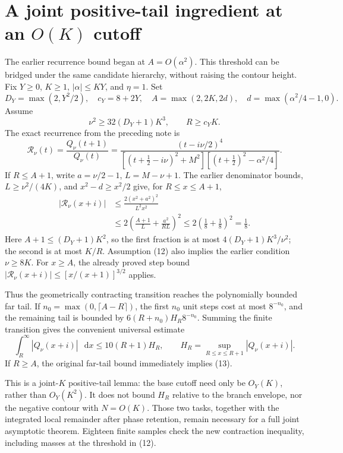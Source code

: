\documentclass[11pt,a4paper]{article}
\newcommand{\dd}{\mathop{}\!\mathrm d}
\begin{document}
\newpage
\section{A joint positive-tail ingredient at an \(O(K)\) cutoff}
The earlier recurrence bound began at \(A=O(\alpha^2)\). This
threshold can be bridged under the same candidate hierarchy,
without raising the contour height. Fix \(Y\ge0\), \(K\ge1\),
\(|\alpha|\le KY\), and \(\eta=1\). Set
\[
 D_Y=\max(2,Y^2/2),\quad c_Y=8+2Y,\quad
 A=\max(2,2K,2d),\quad d=\max(\alpha^2/4-1,0).
\]
Assume
\[
 \nu^2\ge32(D_Y+1)K^3,\qquad R\ge c_YK. \tag{12}
\]
The exact recurrence from the preceding note is
\[
 \mathcal R_\nu(t)=\frac{Q_\nu(t+1)}{Q_\nu(t)}
 =\frac{(t-i\nu/2)^4}
 {[(t+\tfrac12-i\nu)^2+M^2][(t+\tfrac12)^2-\alpha^2/4]}.
\]
If \(R\le A+1\), write \(a=\nu/2-1\), \(L=M-\nu+1\).
The earlier denominator bounds, \(L\ge\nu^2/(4K)\), and
\(x^2-d\ge x^2/2\) give, for \(R\le x\le A+1\),
\begin{align*}
 |\mathcal R_\nu(x+i)|
 &\le \frac{2(x^2+a^2)^2}{L^2x^2}\\
 &\le2\left(\frac{A+1}{L}+\frac{a^2}{RL}\right)^2
 \le2\left(\frac18+\frac18\right)^2=\frac18 .
\end{align*}
Here \(A+1\le(D_Y+1)K^2\), so the first fraction is at most
\(4(D_Y+1)K^3/\nu^2\); the second is at most \(K/R\).
Assumption (12) also implies the earlier condition \(\nu\ge8K\).
For \(x\ge A\), the already proved step bound
\(|\mathcal R_\nu(x+i)|\le[x/(x+1)]^{3/2}\) applies.

Thus the geometrically contracting transition reaches the
polynomially bounded far tail. If
\(n_0=\max(0,\lceil A-R\rceil)\), the first \(n_0\) unit steps
cost at most \(8^{-n_0}\), and the remaining tail is bounded by
\(6(R+n_0)H_R8^{-n_0}\). Summing the finite transition gives the
convenient universal estimate
\[
 \int_R^\infty |Q_\nu(x+i)|\,\dd x
 \le10(R+1)H_R,\qquad
 H_R=\sup_{R\le x\le R+1}|Q_\nu(x+i)| . \tag{13}
\]
If \(R\ge A\), the original far-tail bound immediately implies (13).

This is a joint-\(K\) positive-tail lemma: the base cutoff need only
be \(O_Y(K)\), rather than \(O_Y(K^2)\).
It does not bound \(H_R\) relative to the branch envelope, nor the
negative contour with \(N=O(K)\). Those two tasks, together with
the integrated local remainder after phase retention, remain
necessary for a full joint asymptotic theorem.
Eighteen finite samples check the new contraction inequality,
including masses at the threshold in (12).
\end{document}
